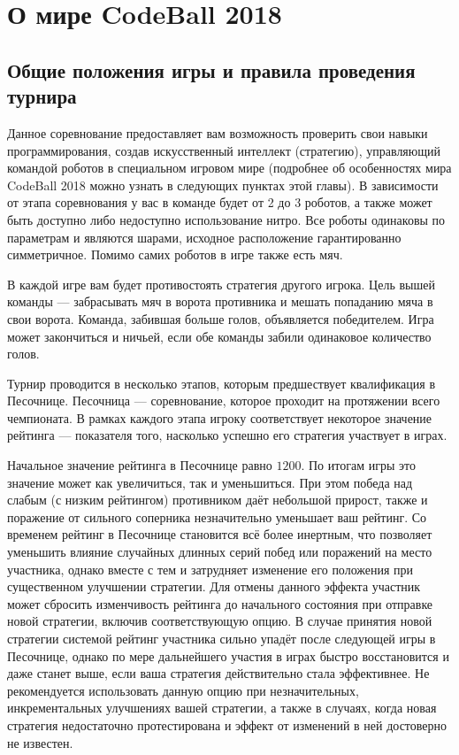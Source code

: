 \chapter{О мире CodeBall 2018}

\newcommand{\const}[1]{\texttt{#1}}

\section{Общие положения игры и правила проведения турнира}

Данное соревнование предоставляет вам возможность проверить свои навыки программирования,
создав искусственный интеллект (стратегию),
управляющий командой роботов в специальном игровом мире
(подробнее об особенностях мира CodeBall 2018 можно узнать в следующих пунктах этой главы).
В зависимости от этапа соревнования у вас в команде будет от 2 до 3 роботов,
а также может быть доступно либо недоступно использование нитро.
Все роботы одинаковы по параметрам и являются шарами, исходное расположение гарантированно симметричное.
Помимо самих роботов в игре также есть мяч.

В каждой игре вам будет противостоять стратегия другого игрока.
Цель вышей команды --- забрасывать мяч в ворота противника и мешать попаданию мяча в свои ворота.
Команда, забившая больше голов, объявляется победителем.
Игра может закончиться и ничьей, если обе команды забили одинаковое количество голов.

Турнир проводится в несколько этапов, которым предшествует квалификация в Песочнице.
Песочница --- соревнование, которое проходит на протяжении всего чемпионата.
В рамках каждого этапа игроку соответствует некоторое значение рейтинга ---
показателя того, насколько успешно его стратегия участвует в играх.

Начальное значение рейтинга в Песочнице равно $1200$.
По итогам игры это значение может как увеличиться, так и уменьшиться.
При этом победа над слабым (с низким рейтингом) противником даёт небольшой прирост,
также и поражение от сильного соперника незначительно уменьшает ваш рейтинг.
Со временем рейтинг в Песочнице становится всё более инертным,
что позволяет уменьшить влияние случайных длинных серий побед или поражений на место участника,
однако вместе с тем и затрудняет изменение его положения при существенном улучшении стратегии.
Для отмены данного эффекта участник может сбросить изменчивость рейтинга до начального состояния при отправке новой стратегии,
включив соответствующую опцию.
В случае принятия новой стратегии системой рейтинг участника сильно упадёт после следующей игры в Песочнице,
однако по мере дальнейшего участия в играх быстро восстановится и даже станет выше,
если ваша стратегия действительно стала эффективнее.
Не рекомендуется использовать данную опцию при незначительных, инкрементальных улучшениях вашей стратегии,
а также в случаях, когда новая стратегия недостаточно протестирована и эффект от изменений в ней достоверно не известен.

